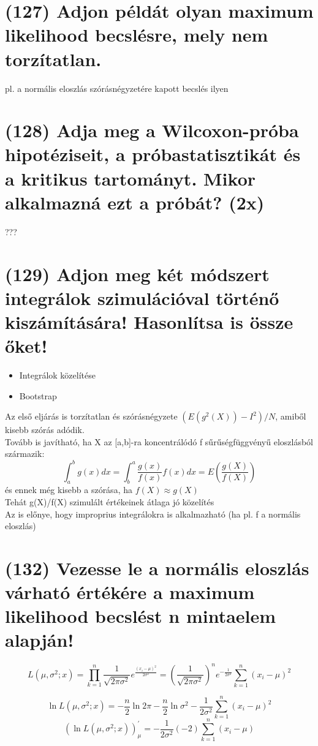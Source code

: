 \documentclass[12p]{article}
\begin{document}
\section{(127) Adjon példát olyan maximum likelihood becslésre, mely nem torzítatlan.}

pl. a normális eloszlás szórásnégyzetére kapott becslés ilyen

\section{(128) Adja meg a Wilcoxon-próba hipotéziseit, a próbastatisztikát és a kritikus tartományt.
Mikor alkalmazná ezt a próbát? (2x)}

???

\section{(129) Adjon meg két módszert integrálok szimulációval történő kiszámítására! Hasonlítsa is
össze őket!}

\begin{itemize}
\item Integrálok közelítése
\item Bootstrap
\end{itemize}

Az első eljárás is torzítatlan és szórásnégyzete $(E(g^2(X)) - I^2) / N$, amiből kisebb szórás adódik.\\
Tovább is javítható, ha X az [a,b]-ra koncentrálódó f sűrűségfüggvényű eloszlásból származik:
$$\int^b_a g(x)dx = \int^a_b \frac{g(x)}{f(x)} f(x)dx = E (\frac{g(X)}{f(X)})$$
és ennek még kisebb a szórása, ha $f(X) \approx g(X)$\\
Tehát g(X)/f(X) szimulált értékeinek átlaga jó közelítés\\
Az is előnye, hogy improprius integrálokra is alkalmazható (ha pl. f a normális eloszlás)

\section{(132) Vezesse le a normális eloszlás várható értékére a maximum likelihood becslést n mintaelem alapján!}

$$L(\mu, \sigma^2;x) 
= \prod^n_{k=1} \frac{1}{\sqrt{2\pi \sigma^2}} 
e^{\frac{(x_i-\mu)^2}{2\sigma^2}}
=\left(\frac{1}{\sqrt{2\pi \sigma^2}}\right)^n 
e^{-\frac{1}{2 \sigma^2}} \sum^n_{k=1} (x_i - \mu )^2$$

$$\ln L(\mu, \sigma^2;x) = - \frac{n}{2} \ln 2\pi - \frac{n}{2} \ln \sigma^2 - \frac{1}{2\sigma^2} \sum^n_{k=1} (x_i - \mu)^2$$
$$(\ln L(\mu,\sigma^2;x))^{'}_{\mu} = - \frac{1}{2\sigma^2}(-2)\sum^n_{k=1}(x_i - \mu)$$
\end{document}
